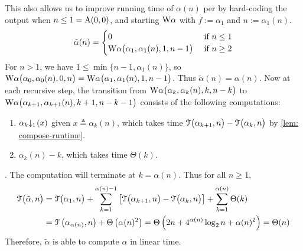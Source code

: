 This also allows us to improve running time of $\alpha(n)$ per  by hard-coding the output when $n\le 1 = \text{A}(0, 0)$, and starting $\text{W}\alpha$ with $f := \alpha_1$ and $n := \alpha_1(n)$.
\begin{equation*}
\tilde{\alpha}(n) = \begin{cases}
0 & \text{ if } n \le 1 \\ \text{W}\alpha\big(\alpha_1, \alpha_1(n), 1, n-1\big) & \text{ if } n \ge 2
\end{cases}
\end{equation*}
For $n > 1$, we have $1\le \min\big\{n-1, \alpha_1(n)\big\}$, so $
\text{W}\alpha\big(\alpha_0, \alpha_0(n), 0, n\big) =
\text{W}\alpha\big(\alpha_1, \alpha_1(n), 1, n-1\big)$.
Thus $\tilde{\alpha}(n) = \alpha(n)$. Now at each recursive step, the transition from $\text{W}\alpha\big(\alpha_k, \alpha_k(n), k, n-k\big)$ to $\text{W}\alpha\big(\alpha_{k+1}, \alpha_{k+1}(n), k+1, n-k-1\big)$ consists of the following computations:
 \begin{enumerate}[label={(\arabic*)}]
	\item $\cdt{\alpha_k}{1}(x)$ given $x\triangleq \alpha_k(n)$, which takes time $\mathcal{T}\big(\alpha_{k+1}, n\big) - \mathcal{T}\big(\alpha_k, n\big)$ by \cref{lem: compose-runtime}.
	\item $\alpha_k(n) - k$, which takes time $\Theta(k)$.
\end{enumerate}.
The computation will terminate at $k = \alpha(n)$. Thus for all $n\ge 1$,
\begin{equation} \label{eq: inv-ack-runtime-improved}
\begin{aligned}
\mathcal{T}\big(\tilde{\alpha}, n\big) & = \mathcal{T}\big(\alpha_1, n\big) + \sum_{k=1}^{\alpha(n) - 1}
\left[ \mathcal{T}\big(\alpha_{k+1}, n\big) - \mathcal{T}\big(\alpha_k, n\big)
\right] + \sum_{k=1}^{\alpha(n)}\Theta(k) \\
& = \mathcal{T}\left(\alpha_{\alpha(n)}, n\right) + \Theta\left(\alpha(n)^2\right)
= \Theta\left(2n + 4^{\alpha(n)}\log_2n + \alpha(n)^2\right) = \Theta(n)
\end{aligned}
\end{equation}
Therefore, $\tilde{\alpha}$ is able to compute $\alpha$ in linear time.
